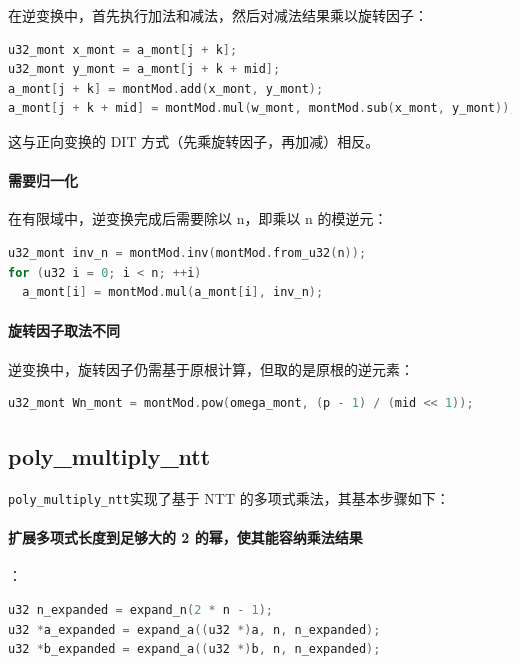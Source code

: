 \documentclass[a4paper]{article}
\begin{document}
在逆变换中，首先执行加法和减法，然后对减法结果乘以旋转因子：

\begin{lstlisting}[language=C++]
u32_mont x_mont = a_mont[j + k];
u32_mont y_mont = a_mont[j + k + mid];
a_mont[j + k] = montMod.add(x_mont, y_mont);
a_mont[j + k + mid] = montMod.mul(w_mont, montMod.sub(x_mont, y_mont));
\end{lstlisting}

这与正向变换的 DIT 方式（先乘旋转因子，再加减）相反。

\paragraph{需要归一化}

在有限域中，逆变换完成后需要除以 n，即乘以 n 的模逆元：

\begin{lstlisting}[language=C++]
u32_mont inv_n = montMod.inv(montMod.from_u32(n));
for (u32 i = 0; i < n; ++i)
  a_mont[i] = montMod.mul(a_mont[i], inv_n);
\end{lstlisting}

\paragraph{旋转因子取法不同}

逆变换中，旋转因子仍需基于原根计算，但取的是原根的逆元素：

\begin{lstlisting}[language=C++]
u32_mont Wn_mont = montMod.pow(omega_mont, (p - 1) / (mid << 1));
\end{lstlisting}

\subsection{poly\_multiply\_ntt}

\texttt{poly\_multiply\_ntt}实现了基于 NTT 的多项式乘法，其基本步骤如下：

\paragraph{扩展多项式长度到足够大的 2 的幂，使其能容纳乘法结果}

：

\begin{lstlisting}[language=C++]
u32 n_expanded = expand_n(2 * n - 1);
u32 *a_expanded = expand_a((u32 *)a, n, n_expanded);
u32 *b_expanded = expand_a((u32 *)b, n, n_expanded);
\end{lstlisting}
\end{document}
